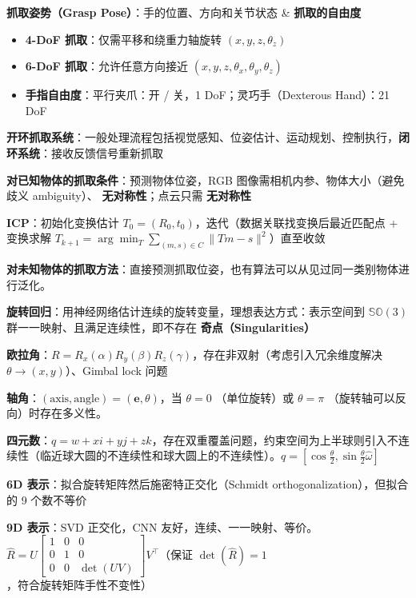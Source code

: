 \documentclass[
  8pt]{extarticle}
\providecommand{\tightlist}{%
  \setlength{\itemsep}{0pt}\setlength{\parskip}{0pt}}
\begin{document}
\begin{multicols*}{4}
\textbf{抓取姿势（Grasp Pose）}：手的位置、方向和关节状态 \&
\textbf{抓取的自由度}

\begin{itemize}
\tightlist
\item
  \textbf{4-DoF 抓取}：仅需平移和绕重力轴旋转 \((x, y, z, \theta_z)\)
\item
  \textbf{6-DoF 抓取}：允许任意方向接近
  \((x, y, z, \theta_x, \theta_y, \theta_z)\)
\item
  \textbf{手指自由度}：平行夹爪：开 / 关，1 DoF；灵巧手（Dexterous
  Hand）：21 DoF
\end{itemize}

\textbf{开环抓取系统}：一般处理流程包括视觉感知、位姿估计、运动规划、控制执行，\textbf{闭环系统}：接收反馈信号重新抓取

\textbf{对已知物体的抓取条件}：预测物体位姿，RGB
图像需相机内参、物体大小（避免歧义 ambiguity）、
\textbf{无对称性}；点云只需 \textbf{无对称性}

\textbf{ICP}：初始化变换估计
\(T_0 = (R_0, t_0)\)，迭代（数据关联找变换后最近匹配点 + 变换求解
\(T_{k+1} = \arg \min_T \sum_{(m,s) \in C} \| Tm - s \|^2\)）直至收敛

\textbf{对未知物体的抓取方法}：直接预测抓取位姿，也有算法可以从见过同一类别物体进行泛化。

\textbf{旋转回归}：用神经网络估计连续的旋转变量，理想表达方式：表示空间到
\(\mathbb{SO}(3)\) 群一一映射、且满足连续性，即不存在
\textbf{奇点（Singularities）}

\textbf{欧拉角}：\(R = R_x(\alpha)R_y(\beta)R_z(\gamma)\)，存在非双射（考虑引入冗余维度解决
\(\theta \to (x,y)\)）、Gimbal lock 问题

\textbf{轴角}：\((\text{axis}, \text{angle}) = (\mathbf{e}, \theta)\)，当
\(\theta=0\) （单位旋转）或 \(\theta=\pi\)
（旋转轴可以反向）时存在多义性。

\textbf{四元数}：\(q = w + xi + yj + zk\)，存在双重覆盖问题，约束空间为上半球则引入不连续性（临近球大圆的不连续性和球大圆上的不连续性）。\(q = \left[\cos\frac{\theta}{2}, \sin\frac{\theta}{2} \hat{\omega}\right]\)

\textbf{6D 表示}：拟合旋转矩阵然后施密特正交化（Schmidt
orthogonalization），但拟合的 9 个数不等价

\textbf{9D 表示}：SVD 正交化，CNN
友好，连续、一一映射、等价。\(\hat{R} = U\begin{bmatrix} 1 & 0 & 0 \\ 0 & 1 & 0 \\ 0 & 0 & \det(UV) \end{bmatrix}V^{\top}\)（保证
\(\det(\hat{R}) = 1\)，符合旋转矩阵手性不变性）


\end{multicols*}
\end{document}
